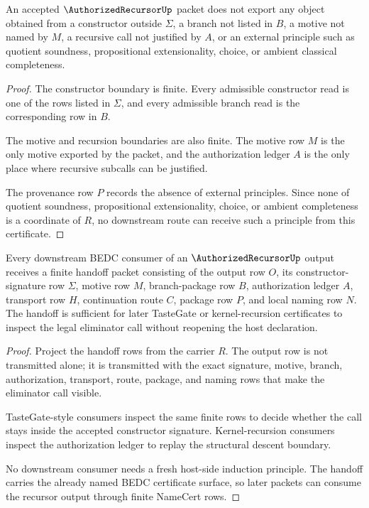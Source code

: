 \begin{theorem}
\label{thm:authorized-recursor-non-escape-boundary}
An accepted $\AuthorizedRecursorUp$ packet does not export any object obtained from a constructor outside $\Sigma$, a branch not listed in $B$, a motive not named by $M$, a recursive call not justified by $A$, or an external principle such as quotient soundness, propositional extensionality, choice, or ambient classical completeness.
\end{theorem}
\begin{proof}
The constructor boundary is finite. Every admissible constructor read is one of the rows listed in $\Sigma$, and every admissible branch read is the corresponding row in $B$.

The motive and recursion boundaries are also finite. The motive row $M$ is the only motive exported by the packet, and the authorization ledger $A$ is the only place where recursive subcalls can be justified.

The provenance row $P$ records the absence of external principles. Since none of quotient soundness, propositional extensionality, choice, or ambient completeness is a coordinate of $R$, no downstream route can receive such a principle from this certificate.
\end{proof}

\begin{theorem}
\label{thm:authorized-recursor-downstream-handoff}
Every downstream BEDC consumer of an $\AuthorizedRecursorUp$ output receives a finite handoff packet consisting of the output row $O$, its constructor-signature row $\Sigma$, motive row $M$, branch-package row $B$, authorization ledger $A$, transport row $H$, continuation route $C$, package row $P$, and local naming row $N$. The handoff is sufficient for later TasteGate or kernel-recursion certificates to inspect the legal eliminator call without reopening the host declaration.
\end{theorem}
\begin{proof}
Project the handoff rows from the carrier $R$. The output row is not transmitted alone; it is transmitted with the exact signature, motive, branch, authorization, transport, route, package, and naming rows that make the eliminator call visible.

TasteGate-style consumers inspect the same finite rows to decide whether the call stays inside the accepted constructor signature. Kernel-recursion consumers inspect the authorization ledger to replay the structural descent boundary.

No downstream consumer needs a fresh host-side induction principle. The handoff carries the already named BEDC certificate surface, so later packets can consume the recursor output through finite NameCert rows.
\end{proof}

